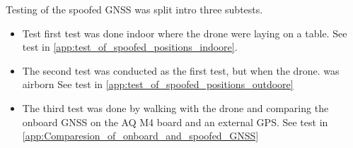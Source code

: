 Testing of the spoofed GNSS was split intro three subtests.
\begin{itemize}
	\item Test first test was done indoor where the drone were laying on a table. See test in  \ref{app:test_of_spoofed_positions_indoore}.
	\item The second test was conducted as the first test, but when the drone. was airborn See test in \ref{app:test_of_spoofed_positions_outdoore}
	\item The third test was done by walking with the drone and comparing the onboard GNSS on the AQ M4 board and an external GPS. See test in \ref{app:Comparesion_of_onboard_and_spoofed_GNSS}
\end{itemize}








